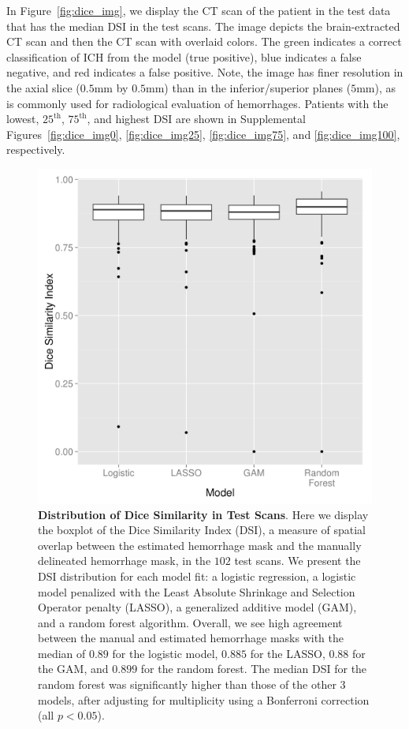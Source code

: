 \documentclass{elsarticle_nonatbib}\usepackage[]{graphicx}\usepackage[]{color}
\begin{document}
In Figure~\ref{fig:dice_img}, we display the CT scan of the patient in the test data that has the median DSI in the test scans. The image depicts the brain-extracted CT scan and then the CT scan with overlaid colors.  The green indicates a correct classification of ICH from the model (true positive), blue indicates a false negative, and red indicates a false positive.  Note, the image has finer resolution in the axial slice ($0.5$mm by $0.5$mm) than in the inferior/superior planes ($5$mm), as is commonly used for radiological evaluation of hemorrhages.  Patients with the lowest, $25^{\text{th}}$, $75^{\text{th}}$, and highest DSI are shown in Supplemental Figures~\ref{fig:dice_img0}, \ref{fig:dice_img25}, \ref{fig:dice_img75}, and \ref{fig:dice_img100}, respectively.



\begin{figure}
\centering
\includegraphics[width=0.75\linewidth,keepaspectratio]{Reseg_Dice_Comparison.png}
\caption{{\bf Distribution of Dice Similarity in Test Scans}.  Here we display the boxplot of the Dice Similarity Index (DSI), a measure of spatial overlap between the estimated hemorrhage mask and the manually delineated hemorrhage mask, in the $102$ test scans.  We present the DSI distribution for each model fit: a logistic regression, a logistic model penalized with the Least Absolute Shrinkage and Selection Operator penalty (LASSO), a generalized additive model (GAM), and a random forest algorithm.  Overall, we see high agreement between the manual and estimated hemorrhage masks with the median of $0.89$ for the logistic model, $0.885$ for the LASSO, $0.88$ for the GAM, and $0.899$ for the random forest. The median DSI for the random forest was significantly higher than those of the other 3 models, after adjusting for multiplicity using a Bonferroni correction (all $p < 0.05$).   }
\label{fig:dice}
\end{figure}
\end{document}
